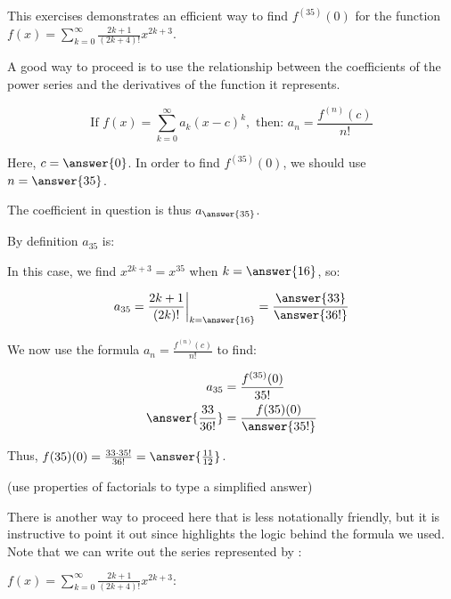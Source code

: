 \documentclass{ximera}
\author{Jim Talamo}
\begin{document}
\begin{exercise}
This exercises demonstrates an efficient way to find $f^{(35)}(0)$ for the function $f(x) = \sum_{k=0}^{\infty} \frac{2k+1}{(2k+4)!}x^{2k+3}$.  

A good way to proceed is to use the relationship between the coefficients of the power series and the derivatives of the function it represents.

\[
\textrm{If } f(x) = \sum_{k=0}^{\infty} a_k(x-c)^k, \textrm{ then: } a_n = \frac{f^{(n)}(c)}{n!}
\]

Here, $c=\answer{0}$.  In order to find $f^{(35)}(0)$, we should use $n=\answer{35}$.

The coefficient in question is thus $a_{\answer{35}}$.  

\begin{exercise}
By definition $a_{35}$ is:

\begin{multipleChoice}
\end{multipleChoice}

In this case, we find $x^{2k+3}=x^{35}$ when $k=\answer{16}$, so:

\[
a_{35} =  \frac{2k+1}{(2k)!} \bigg|_{k=\answer{16}} = \frac{\answer{33}}{\answer{36!}}
\]

\begin{exercise}
We now use the formula $a_n = \frac{f^{(n)}(c)}{n!}$ to find:

\begin{align*}
a_{35} &= \frac{f^{(35)}(0)}{35!} \\
\answer{\frac{33}{36!}} &= \frac{f{(35)}(0)}{\answer{35!}}
\end{align*}

\begin{exercise}
Thus, $f{(35)}(0) = \frac{33 \cdot 35!}{36!} = \answer{\frac{11}{12}}$.

(use properties of factorials to type a simplified answer)

\begin{exercise}
There is another way to proceed here that is less notationally friendly, but it is instructive to point it out since highlights the logic behind the formula we used.  Note that we can write out the series represented by :

$f(x) = \sum_{k=0}^{\infty} \frac{2k+1}{(2k+4)!}x^{2k+3}:$

\begin{image}
  \end{image}


\end{exercise}
\end{exercise}
\end{exercise}
\end{exercise}
\end{exercise}
\end{document}
